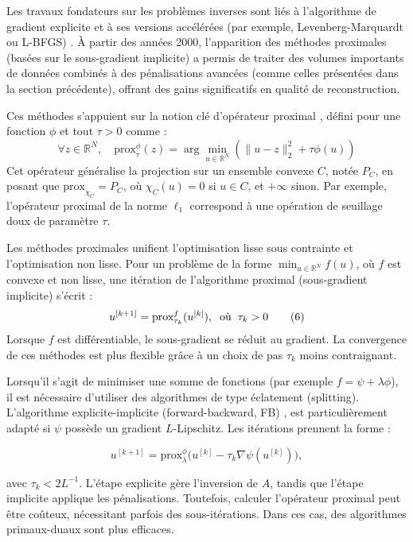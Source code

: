 \documentclass[a4paper, 12pt]{report} %
\begin{document}
Les travaux fondateurs sur les problèmes inverses sont liés à l’algorithme de gradient explicite et à ses versions accélérées (par exemple, Levenberg-Marquardt ou L-BFGS) \cite{nocedal1999numerical}. À partir des années 2000, l’apparition des méthodes proximales \cite{bauschke2017correction} (basées sur le sous-gradient implicite) a permis de traiter des volumes importants de données combinés à des pénalisations avancées (comme celles présentées dans la section précédente), offrant des gains significatifs en qualité de reconstruction.

Ces méthodes s’appuient sur la notion clé d’opérateur proximal \cite{moreau1965proximite}, défini pour une fonction \(\phi\) et tout \(\tau > 0\) comme :
\[
\forall z \in \mathbb{R}^N, \quad \text{prox}_{\tau}^{\phi}(z) = \arg \min_{ u\in \mathbb{R}^N} \left( \|u - z\|_2^2 + \tau \phi(u) \right) \tag{5}
\]
Cet opérateur généralise la projection sur un ensemble convexe \(C\), notée \(P_C\), en posant que \(\text{prox}_{\chi_C} = P_C\), où \(\chi_C(u) = 0\) si \(u \in C\), et \(+\infty\) sinon. Par exemple, l’opérateur proximal de la norme \(\ell_1\) correspond à une opération de seuillage doux de paramètre \(\tau\).

Les méthodes proximales unifient l’optimisation lisse sous contrainte et l’optimisation non lisse. Pour un problème de la forme $\min_{u \in \mathbb{R}^N} f(u)$, où \(f\) est convexe et non lisse, une itération de l’algorithme proximal (sous-gradient implicite) s’écrit :
\[
u^{[k+1]} = \text{prox}_{\tau_k}^{f}(u^{[k]}), \hspace{0.2cm} \text{où} \hspace{0.2cm} \tau_k > 0 \tag{6}
\]
Lorsque \(f\) est différentiable, le sous-gradient se réduit au gradient. La convergence de ces méthodes est plus flexible grâce à un choix de pas \(\tau_k\) moins contraignant.

Lorsqu’il s’agit de minimiser une somme de fonctions (par exemple \(f = \psi + \lambda \phi\)), il est nécessaire d’utiliser des algorithmes de type éclatement (splitting). L’algorithme explicite-implicite (forward-backward, FB) \cite{chaux2007variational} , est particulièrement adapté si \(\psi\) possède un gradient \(L\)-Lipschitz. Les itérations prennent la forme :

\[
u^{[k+1]} = \text{prox}_{\lambda}^{\phi} \Big(u^{[k]} - \tau_k \nabla \psi(u^{[k]})\Big), \tag{7}
\]

avec \(\tau_k < 2L^{-1}\). L’étape explicite gère l’inversion de \(A\), tandis que l’étape implicite applique les pénalisations. Toutefois, calculer l’opérateur proximal peut être coûteux, nécessitant parfois des sous-itérations. Dans ces cas, des algorithmes primaux-duaux \cite{chambolle2016introduction} sont plus efficaces.
\end{document}
